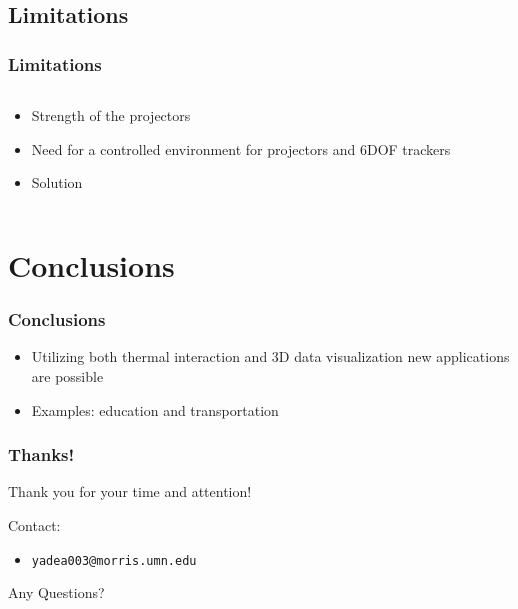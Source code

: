 \documentclass{beamer}
\newcommand{\linespace}{\vskip 0.25cm}
\begin{document}
\subsection{Limitations}
\begin{frame}	
\frametitle{Limitations}
    \begin{columns}
    \begin{column}{.8\textwidth}
	\begin{itemize}
		\item Strength of the projectors 
		\item Need for a controlled environment for projectors and 6DOF trackers
		\item Solution
	\end{itemize}
	\end{column}
	\end{columns}
\end{frame}

\section[Conclusions]{Conclusions}
\begin{frame}
\frametitle{Conclusions}
	\begin{itemize}
		\item Utilizing both thermal interaction and 3D data visualization new applications are possible
		\item Examples: education and transportation

	\end{itemize}
\end{frame}

\begin{frame}
	\frametitle{Thanks!}
	
	Thank you for your time and attention!
		
	\linespace
	\linespace
	
	Contact:  
	\begin{itemize}
		\item \texttt{yadea003@morris.umn.edu}
	\end{itemize}
	
	\linespace
	\linespace
	
	\begin{center}
	{\huge Any Questions?}
	\end{center}
\end{frame}
\end{document}
